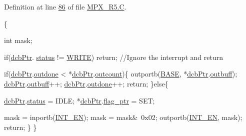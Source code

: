 Definition at line \hyperlink{_m_p_x___r5_8_c_source_l00086}{86} of file \hyperlink{_m_p_x___r5_8_c_source}{MPX\_\-R5.C}.




\begin{DoxyCode}
                          \{

                \textcolor{keywordtype}{int} mask; 
         
                \textcolor{keywordflow}{if}(\hyperlink{_m_p_x___r5_8h_acf6724d515070007ff4ac39c32640311}{dcbPtr}. \hyperlink{trmdrive_8c_a6e27f49150e9a14580fb313cc2777e00}{status} != \hyperlink{_m_p_x___r5_8h_aa10f470e996d0f51210d24f442d25e1e}{WRITE}) 
                        \textcolor{keywordflow}{return}; \textcolor{comment}{//Ignore the interrupt and return}

                \textcolor{keywordflow}{if}(\hyperlink{_m_p_x___r5_8h_acf6724d515070007ff4ac39c32640311}{dcbPtr}.\hyperlink{structdevice_ab7c43127bcb340d678131fd04c37ba05}{outdone} < *\hyperlink{_m_p_x___r5_8h_acf6724d515070007ff4ac39c32640311}{dcbPtr}.\hyperlink{structdevice_ae597c46dee282a47174100b12525b424}{outcount})\{
                        outportb(\hyperlink{_m_p_x___r5_8h_a79bcfb6bde984f42d1124b068a509af7}{BASE}, *\hyperlink{_m_p_x___r5_8h_acf6724d515070007ff4ac39c32640311}{dcbPtr}.\hyperlink{structdevice_a32acea82810b51d93df2d3ced6cdffb7}{outbuff});
                        \hyperlink{_m_p_x___r5_8h_acf6724d515070007ff4ac39c32640311}{dcbPtr}.\hyperlink{structdevice_a32acea82810b51d93df2d3ced6cdffb7}{outbuff}++; 
                        \hyperlink{_m_p_x___r5_8h_acf6724d515070007ff4ac39c32640311}{dcbPtr}.\hyperlink{structdevice_ab7c43127bcb340d678131fd04c37ba05}{outdone}++;
                        \textcolor{keywordflow}{return};
                \}\textcolor{keywordflow}{else}\{

                        \hyperlink{_m_p_x___r5_8h_acf6724d515070007ff4ac39c32640311}{dcbPtr}.\hyperlink{structdevice_aaaefcdae0117d89bef5340a1e3f432e1}{status} = IDLE;
                        *\hyperlink{_m_p_x___r5_8h_acf6724d515070007ff4ac39c32640311}{dcbPtr}.\hyperlink{structdevice_aa14e67b7bd4e2bc5751268f0be91983f}{flag_ptr} = SET;

                        mask = inportb(\hyperlink{_m_p_x___r5_8h_a8dc8a6ba32861f0a3cbd89fa1ec0d216}{INT_EN});
                        mask = mask&~0x02;
                        outportb(\hyperlink{_m_p_x___r5_8h_a8dc8a6ba32861f0a3cbd89fa1ec0d216}{INT_EN}, mask);
                        \textcolor{keywordflow}{return};
                \}
        \}
\end{DoxyCode}


